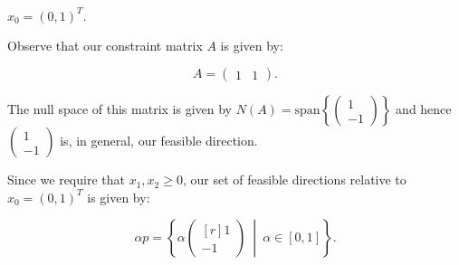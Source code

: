 $x_0 = (0, 1)^T.$

\begin{solution}
  Observe that our constraint matrix $A$ is given by:

  $$
  A = \begin{pmatrix}
    1 & 1
  \end{pmatrix}.
  $$

  The null space of this matrix is given by $N(A) = \text{span}\left\{ \begin{pmatrix} 1 \\ -1 \end{pmatrix} \right\}$
  and hence $\begin{pmatrix} 1 \\ -1 \end{pmatrix}$ is, in general, our feasible direction.

  Since we require that $x_1, x_2 \geq 0$, our set of feasible directions relative to $x_0 = (0, 1)^T$ is given by:

  $$
  \alpha p = \left\{ \alpha \begin{pmatrix*}[r] 1 \\ -1 \end{pmatrix*} \ \middle| \ \alpha \in [0, 1] \right\}.
  $$


  \ \\
\end{solution}